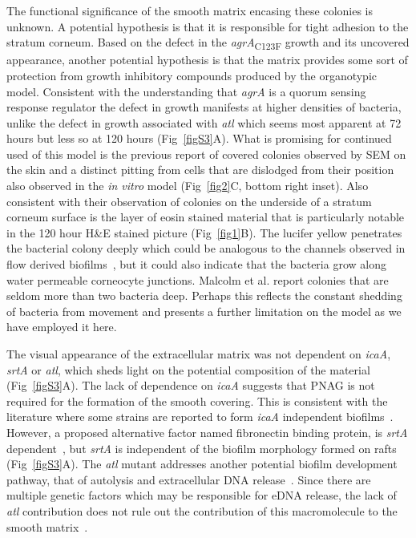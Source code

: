 \documentclass[10pt,letterpaper]{article}
\begin{document}
The functional significance of the smooth matrix encasing these colonies is unknown.
A potential hypothesis is that it is responsible for tight adhesion to the stratum corneum.
Based on the defect in the \textit{agrA}\textsubscript{C123F} growth and its uncovered appearance,  another potential hypothesis is that the matrix provides some sort of protection from growth inhibitory compounds produced by the organotypic model.
Consistent with the understanding that \textit{agrA} is a quorum sensing response regulator the defect in growth manifests at higher densities of bacteria, unlike the defect in growth associated with \textit{atl} which seems most apparent at 72 hours but less so at 120 hours (Fig~\ref{figS3}A).
What is promising for continued used of this model is the previous report of covered colonies observed by SEM on the skin and a distinct pitting from cells that are dislodged from their position~\cite{malcolm_demonstration_1980} also observed in the \textit{in vitro} model (Fig~\ref{fig2}C, bottom right inset).
Also consistent with their observation of colonies on the underside of a stratum corneum surface is the layer of eosin stained material that is particularly notable in the 120 hour H\&E stained picture (Fig~\ref{fig1}B).
The lucifer yellow penetrates the bacterial colony deeply which could be analogous to the channels observed in flow derived biofilms~\cite{periasamy_how_2012}, but it could also indicate that the bacteria grow along water permeable corneocyte junctions.
Malcolm et al. report colonies that are seldom more than two bacteria deep.
Perhaps this reflects the constant shedding of bacteria from movement and presents a further limitation on the model as we have employed it here.

The visual appearance of the extracellular matrix was not dependent on \textit{icaA}, \textit{srtA} or \textit{atl}, which sheds light on the potential composition of the material (Fig~\ref{figS3}A).
The lack of dependence on \textit{icaA} suggests that PNAG is not required for the formation of the smooth covering.
This is consistent with the literature where some strains are reported to form \textit{icaA} independent biofilms~\cite{fitzpatrick_evidence_2005}.
However, a proposed alternative factor named fibronectin binding protein, is \textit{srtA} dependent~\cite{oneill_novel_2008}, but \textit{srtA} is independent of the biofilm morphology formed on rafts (Fig~\ref{figS3}A).
The \textit{atl} mutant addresses another potential biofilm development pathway, that of autolysis and extracellular DNA release~\cite{bose_contribution_2012}.
Since there are multiple genetic factors which may be responsible for eDNA release, the lack of \textit{atl} contribution does not rule out the contribution of this macromolecule to the smooth matrix~\cite{ranjit_staphylococcus_2011}.
\end{document}
